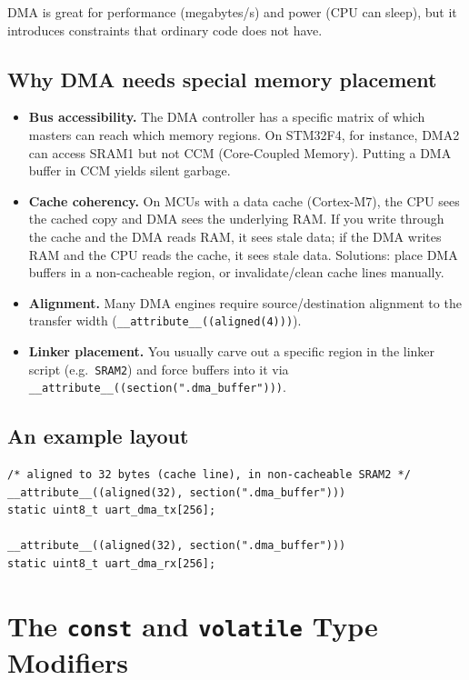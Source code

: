 \documentclass[11pt,a4paper]{article}
\begin{document}
DMA is great for performance (megabytes/s) and power (CPU can sleep), but
it introduces constraints that ordinary code does not have.

\subsection{Why DMA needs special memory placement}

\begin{itemize}[leftmargin=*]
    \item \textbf{Bus accessibility.} The DMA controller has a specific
    matrix of which masters can reach which memory regions. On STM32F4,
    for instance, DMA2 can access SRAM1 but not CCM (Core-Coupled Memory).
    Putting a DMA buffer in CCM yields silent garbage.
    \item \textbf{Cache coherency.} On MCUs with a data cache (Cortex-M7),
    the CPU sees the cached copy and DMA sees the underlying RAM. If you
    write through the cache and the DMA reads RAM, it sees stale data; if
    the DMA writes RAM and the CPU reads the cache, it sees stale data.
    Solutions: place DMA buffers in a non-cacheable region, or
    invalidate/clean cache lines manually.
    \item \textbf{Alignment.} Many DMA engines require source/destination
    alignment to the transfer width (\texttt{\_\_attribute\_\_((aligned(4)))}).
    \item \textbf{Linker placement.} You usually carve out a specific
    region in the linker script (e.g.\ \texttt{SRAM2}) and force buffers
    into it via \texttt{\_\_attribute\_\_((section(".dma\_buffer")))}.
\end{itemize}

\subsection{An example layout}

\begin{lstlisting}[style=C]
/* aligned to 32 bytes (cache line), in non-cacheable SRAM2 */
__attribute__((aligned(32), section(".dma_buffer")))
static uint8_t uart_dma_tx[256];

__attribute__((aligned(32), section(".dma_buffer")))
static uint8_t uart_dma_rx[256];
\end{lstlisting}

\section{The \texttt{const} and \texttt{volatile} Type Modifiers}
\end{document}
